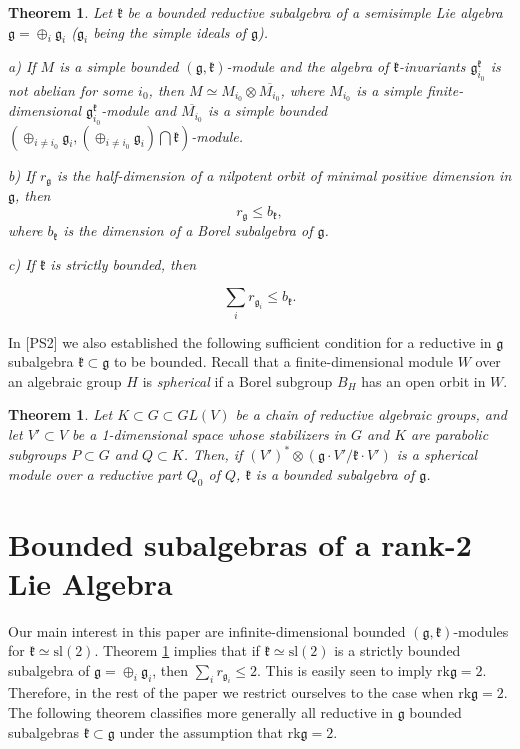 \documentclass[12pt]{amsart}
\theoremstyle{plain} %
\newtheorem{theorem}[definition]{Theorem}
\newcommand{\rk}{\mathrm{rk }}
\renewcommand{\sl}{\mathrm{sl}}
\newcommand{\kk}{\mathfrak{k}}
\renewcommand{\gg}{\mathfrak{g}}
\newcommand{\refth}[1]{Theorem \ref{#1}}
\begin{document}
\begin{theorem}\label{1}
 Let $\kk$ be a bounded reductive subalgebra of a semisimple Lie algebra $\displaystyle \gg=\oplus_i \gg_i$ ($\gg_i$ being the simple ideals of $\gg$).


a) If $M$ is a simple bounded $(\gg, \kk)$-module and the algebra of $\kk$-invariants $\gg_{i_0}^{\kk}$ is not abelian for some $i_0$, then $M \simeq M_{i_0}\otimes \overline{M_{i_0}}$, where $M_{i_0}$ is a simple finite-dimensional $\gg_{i_0}^{\kk}$-module and $\overline{M_{i_0}}$ is a simple bounded $(\oplus_{i\neq {i_0}}\gg_i,(\oplus_{i\neq {i_0}}\gg_i)\bigcap\kk)$-module.


b) If $r_\gg$ is the half-dimension of a nilpotent orbit of minimal positive dimension in $\gg$, then
\begin{equation}\label{1}
r_{\gg}\leq b_{\kk},
\end{equation}
where $b_\kk$ is the dimension of a Borel subalgebra of $\gg$.



c) If $\kk$ is strictly bounded, then

$$\sum_i r_{\gg_i}\leq b_{\kk}.$$



\end{theorem}

In [PS2] we also established the following sufficient condition for a reductive in $\gg$ subalgebra $\kk\subset\gg$ to be bounded. Recall that a finite-dimensional module $W$ over an algebraic group $H$ is \textit{spherical} if a Borel subgroup $B_{H}$ has an open orbit in $W$. 

\begin{theorem}\label{2}
Let $K\subset G\subset GL(V)$ be a chain of reductive algebraic
groups, and let $V'\subset V$ be a 1-dimensional space whose
stabilizers in $G$ and $K$ are parabolic subgroups $P\subset G$ and
$Q\subset K$. Then, if $(V')^*\otimes(\gg\cdot V'/\kk\cdot V')$ is a
spherical module over a reductive part $Q_0$ of $Q$, $\kk$ is a bounded subalgebra of $\gg$.
\end{theorem} 


\section{Bounded subalgebras of a rank-2 Lie Algebra}\label{secRank2Case}

Our main interest in this paper are infinite-dimensional bounded $(\gg, \kk)$-modules for $\kk\simeq\sl(2)$. \refth{1} implies that if $\kk\simeq\sl(2)$ is a strictly bounded subalgebra of $\gg=\oplus_i \gg_{i}$, then $\sum_i r_{\gg_i}\leq 2$. This is easily seen to imply $\rk \gg=2$. Therefore, in the rest of the paper we restrict ourselves to the case when $\rk\gg=2$. The following theorem classifies more generally all reductive in $\gg$ bounded subalgebras $\kk\subset\gg$ under the assumption that $\rk\gg=2$.
\end{document}
